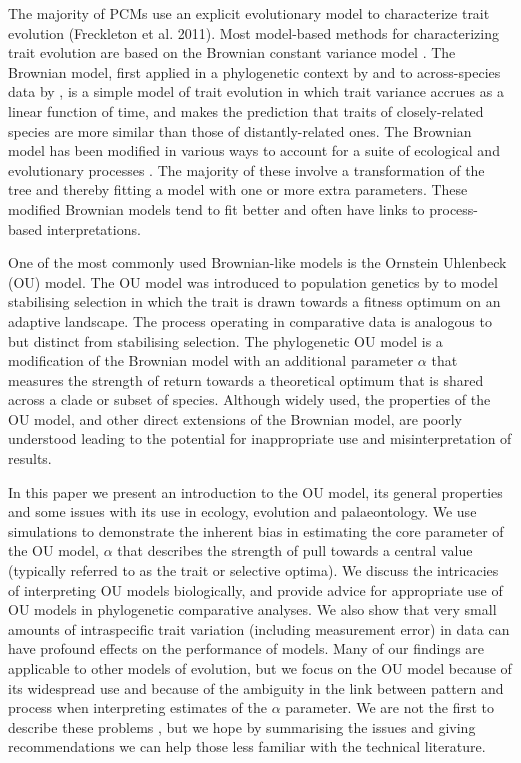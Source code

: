 \documentclass[a4paper,12pt]{article}
\begin{document}
  The majority of PCMs use an explicit evolutionary model to characterize trait evolution (Freckleton et al. 2011). Most model-based methods for characterizing trait evolution are based on the Brownian constant variance model \citep[for exceptions see][]{price1997correlated,harvey2000comparative,freckleton2006detecting}. 
  The Brownian model, first applied in a phylogenetic context by \citet{cavalli1967} and to across-species data by \citet{felsenstein1973maximum}, is a simple model of trait evolution in which trait variance accrues as a linear function of time, and makes the prediction that traits of closely-related species are more similar than those of distantly-related ones. 
  The Brownian model has been modified in various ways to account for a suite of ecological and evolutionary processes \citep[e.g.,][]{grafen1989phylogenetic,hansen1997stabilizing,Pagel:1997aa,Pagel:1999aa}. 
  The majority of these involve a transformation of the tree and thereby fitting a model with one or more extra parameters. 
  These modified Brownian models tend to fit better and often have links to process-based interpretations. 

  One of the most commonly used Brownian-like models is the Ornstein Uhlenbeck (OU) model. 
  The OU model was introduced to population genetics by \cite{Lande:1976aa} to model stabilising selection in which the trait is drawn towards a fitness optimum on an adaptive landscape. 
  The process operating in comparative data is analogous to but distinct from stabilising selection. The phylogenetic OU model is a modification of the Brownian model with an additional parameter $\alpha$ that measures the strength of return towards a theoretical optimum \citep{hansen1997stabilizing} that is shared across a clade or subset of species.
  Although widely used, the properties of the OU model, and other direct extensions of the Brownian model, are poorly understood leading to the potential for inappropriate use and misinterpretation of results.

  In this paper we present an introduction to the OU model, its general properties and some issues with its use in ecology, evolution and palaeontology.
  We use simulations to demonstrate the inherent bias in estimating the core parameter of the OU model, $\alpha$ that describes the strength of pull towards a central value (typically referred to as the trait or selective optima). We discuss the intricacies of interpreting OU models biologically, and provide advice for appropriate use of OU models in phylogenetic comparative analyses. 
  We also show that very small amounts of intraspecific trait variation (including measurement error) in data can have profound effects on the performance of models. 
  Many of our findings are applicable to other models of evolution, but we focus on the OU model because of its widespread use and because of the ambiguity in the link between pattern and process when interpreting estimates of the $\alpha$ parameter. 
  We are not the first to describe these problems \citep[e.g.,][]{ho2013asymptotic,ho2014intrinsic,boettiger2012your,hansen2012interpreting,ives2010phylogenetic}, but we hope by summarising the issues and giving recommendations we can help those less familiar with the technical literature.
\end{document}

